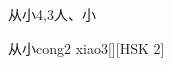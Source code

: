 \begin{entry}{从小}{4,3}{⼈、⼩}
  \begin{phonetics}{从小}{cong2 xiao3}[][HSK 2]
  \end{phonetics}
\end{entry}
